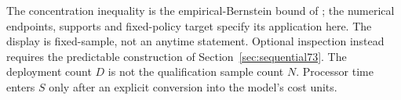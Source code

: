 The concentration inequality is the empirical-Bernstein bound of \citet{maurer2009}; the numerical endpoints, supports and fixed-policy target specify its application here. The display is fixed-sample, not an anytime statement. Optional inspection instead requires the predictable construction of Section~\ref{sec:sequential73}. The deployment count $D$ is not the qualification sample count $N$. Processor time enters $S$ only after an explicit conversion into the model's cost units.
